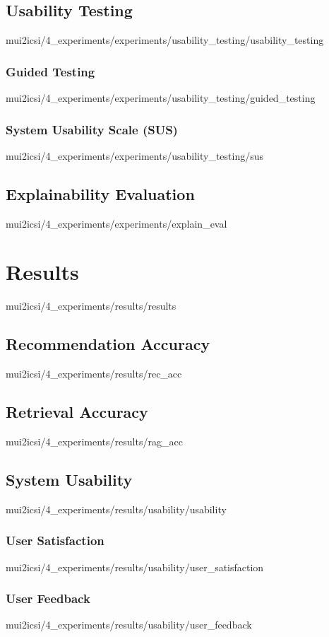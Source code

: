 \documentclass[english,epsbased,copyright,final,printable,covers,extendedindex,firstnumbered,tfm,gnuplot,loc,loe,lof,lot]{tfgtfmthesisuam}
\begin{document}
      \subsection{Usability Testing\label{SS:USABILITYTEST}}{mui2icsi/4_experiments/experiments/usability_testing/usability_testing}
        \subsubsection{Guided Testing\label{SSS:GUIDEDTEST}}{mui2icsi/4_experiments/experiments/usability_testing/guided_testing}
        \subsubsection{System Usability Scale (SUS)\label{SSS:SUS}}{mui2icsi/4_experiments/experiments/usability_testing/sus}
      \subsection{Explainability Evaluation\label{SS:EXPLAINEVAL}}{mui2icsi/4_experiments/experiments/explain_eval}

    \section{Results\label{SEC:RESULTS}}{mui2icsi/4_experiments/results/results}
      \subsection{Recommendation Accuracy\label{SS:RECACC}}{mui2icsi/4_experiments/results/rec_acc}
      \subsection{Retrieval Accuracy\label{SS:RAGACC}}{mui2icsi/4_experiments/results/rag_acc}
      \subsection{System Usability\label{SS:USABILITY}}{mui2icsi/4_experiments/results/usability/usability}
        \subsubsection{User Satisfaction\label{SSS:USERSAT}}{mui2icsi/4_experiments/results/usability/user_satisfaction}
        \subsubsection{User Feedback\label{SSS:USERFEEDBACK}}{mui2icsi/4_experiments/results/usability/user_feedback}
\end{document}
